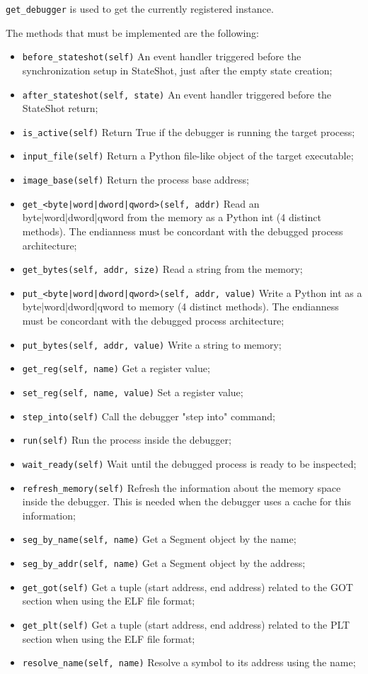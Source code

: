 \verb|get_debugger| is used to get the currently registered instance.

The methods that must be implemented are the following:

\begin{itemize}
\item \verb|before_stateshot(self)| An event handler triggered before the synchronization setup in StateShot, just after the empty state creation;
\item \verb|after_stateshot(self, state)| An event handler triggered before the StateShot return;
\item \verb|is_active(self)| Return True if the debugger is running the target process;
\item \verb|input_file(self)| Return a Python file-like object of the target executable;
\item \verb|image_base(self)| Return the process base address;
\item \lstinline{get_<byte|word|dword|qword>(self, addr)} Read an byte|word|dword|qword from the memory as a Python int (4 distinct methods). The endianness must be concordant with the debugged process architecture;
\item \verb|get_bytes(self, addr, size)| Read a string from the memory;
\item \lstinline{put_<byte|word|dword|qword>(self, addr, value)} Write a Python int as a byte|word|dword|qword to memory (4 distinct methods). The endianness must be concordant with the debugged process architecture;
\item \verb|put_bytes(self, addr, value)| Write a string to memory;
\item \verb|get_reg(self, name)| Get a register value;
\item \verb|set_reg(self, name, value)| Set a register value;
\item \verb|step_into(self)| Call the debugger "step into" command;
\item \verb|run(self)| Run the process inside the debugger;
\item \verb|wait_ready(self)| Wait until the debugged process is ready to be inspected;
\item \verb|refresh_memory(self)| Refresh the information about the memory space inside the debugger. This is needed when the debugger uses a cache for this information;
\item \verb|seg_by_name(self, name)| Get a Segment object by the name;
\item \verb|seg_by_addr(self, name)| Get a Segment object by the address;
\item \verb|get_got(self)| Get a tuple (start address, end address) related to the GOT section when using the ELF file format;
\item \verb|get_plt(self)| Get a tuple (start address, end address) related to the PLT section when using the ELF file format;
\item \verb|resolve_name(self, name)| Resolve a symbol to its address using the name;
\end{itemize}

